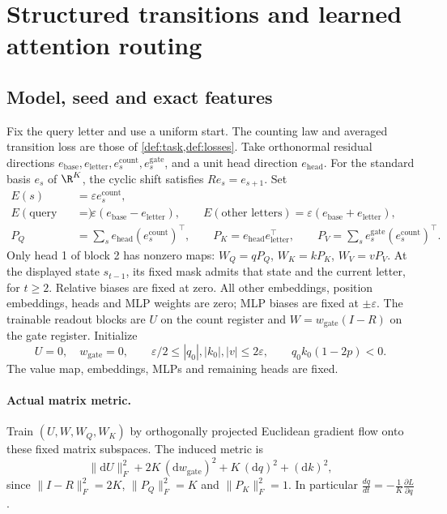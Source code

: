 \section{Structured transitions and learned attention routing}
\label{app:aligned-transformer}

\subsection{Model, seed and exact features}
\label{app:aligned-seed}
Fix the query letter and use a uniform start. The counting law and averaged transition loss are those of \cref{def:task,def:losses}.
Take orthonormal residual directions $e_{\mathrm{base}},e_{\mathrm{letter}},e_s^{\mathrm{count}},
e_s^{\mathrm{gate}}$, and a unit head direction $e_{\mathrm{head}}$.
For the standard basis $e_s$ of $\R^K$, the cyclic shift satisfies $R e_s=e_{s+1}$. Set
\[
\begin{aligned}
 E(s)&=\varepsilon e_s^{\mathrm{count}},\\
 E(\text{query letter})&=\varepsilon(e_{\mathrm{base}}-e_{\mathrm{letter}}),\qquad
 E(\text{other letters})=\varepsilon(e_{\mathrm{base}}+e_{\mathrm{letter}}),\\
 P_Q&=\sum_s e_{\mathrm{head}}(e_s^{\mathrm{count}})^\top,\qquad
 P_K=e_{\mathrm{head}}e_{\mathrm{letter}}^\top,\qquad
 P_V=\sum_s e_s^{\mathrm{gate}}(e_s^{\mathrm{count}})^\top.
\end{aligned}
\]
Only head 1 of block 2 has nonzero maps:
$W_Q=qP_Q$, $W_K=kP_K$, $W_V=vP_V$. At the displayed state $s_{t-1}$,
its fixed mask admits that state and the current letter, for $t\ge2$.
Relative biases are fixed at zero.
All other embeddings, position embeddings, heads and MLP weights are zero;
MLP biases are fixed at $\pm\varepsilon$.
The trainable readout blocks are $U$ on the count register and
$W=w_{\mathrm{gate}}(I-R)$ on the gate register. Initialize
\[
 U=0,\quad w_{\mathrm{gate}}=0,\qquad
 \varepsilon/2\le |q_0|,|k_0|,|v|\le2\varepsilon,
 \qquad q_0k_0(1-2p)<0.
\]
The value map, embeddings, MLPs and remaining heads are fixed.

\paragraph{Actual matrix metric.}
Train $(U,W,W_Q,W_K)$ by orthogonally projected Euclidean gradient flow onto
these fixed matrix subspaces. The induced metric is
\begin{equation}
 \|\mathrm dU\|_F^2+2K\,(\mathrm dw_{\mathrm{gate}})^2+K\,(\mathrm dq)^2+(\mathrm dk)^2,
 \label{eq:aligned-metric}
\end{equation}
since $\|I-R\|_F^2=2K$, $\|P_Q\|_F^2=K$ and $\|P_K\|_F^2=1$.
In particular $\frac{dq}{dt}=-\frac1K\frac{\partial L}{\partial q}$.

